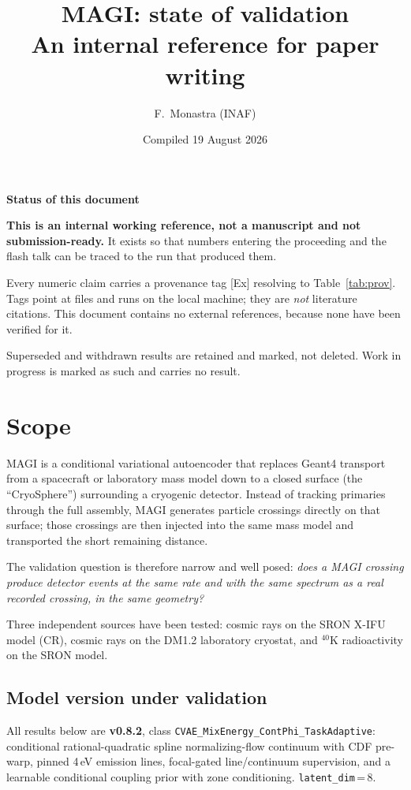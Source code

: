 \documentclass[11pt,a4paper]{article}
\title{\textbf{MAGI: state of validation}\\[2mm]
\large An internal reference for paper writing}
\author{F.\ Monastra (INAF)}
\date{Compiled 19 August 2026}
\newcommand{\ev}[1]{{\footnotesize\textcolor{prov}{[#1]}}}
\newenvironment{callout}[3]%
{\par\medskip\noindent
 \def\calloutframe{#1}\def\calloutback{#2}%
 \setlength{\fboxrule}{0.9pt}\setlength{\fboxsep}{8pt}%
 \begin{lrbox}{\calloutbox}%
 \begin{minipage}{\dimexpr\textwidth-2\fboxsep-2\fboxrule\relax}%
 \setlength{\parskip}{4pt}%
 \textcolor{#1}{\textbf{#3}}\par\nobreak\smallskip}
{\end{minipage}\end{lrbox}%
 \fcolorbox{\calloutframe}{\calloutback}{\usebox{\calloutbox}}%
 \par\medskip}
\begin{document}
\maketitle
\thispagestyle{fancy}

\begin{callout}{warn}{red!4}{Status of this document}
\textbf{This is an internal working reference, not a manuscript and not
submission-ready.} It exists so that numbers entering the proceeding and the
flash talk can be traced to the run that produced them.

Every numeric claim carries a provenance tag \ev{Ex} resolving to
Table~\ref{tab:prov}. Tags point at files and runs on the local machine; they
are \emph{not} literature citations. This document contains no external
references, because none have been verified for it.

Superseded and withdrawn results are retained and marked, not deleted.
Work in progress is marked as such and carries no result.
\end{callout}

\section{Scope}

MAGI is a conditional variational autoencoder that replaces Geant4 transport
from a spacecraft or laboratory mass model down to a closed surface (the
``CryoSphere'') surrounding a cryogenic detector. Instead of tracking primaries
through the full assembly, MAGI generates particle crossings directly on that
surface; those crossings are then injected into the same mass model and
transported the short remaining distance.

The validation question is therefore narrow and well posed: \emph{does a MAGI
crossing produce detector events at the same rate and with the same spectrum as
a real recorded crossing, in the same geometry?}

Three independent sources have been tested: cosmic rays on the SRON X-IFU model
(CR), cosmic rays on the DM1.2 laboratory cryostat, and $^{40}$K
radioactivity on the SRON model.

\subsection{Model version under validation}

All results below are \textbf{v0.8.2}, class
\texttt{CVAE\_MixEnergy\_ContPhi\_TaskAdaptive}: conditional rational-quadratic
spline normalizing-flow continuum with CDF pre-warp, pinned 4\,eV emission
lines, focal-gated line/continuum supervision, and a learnable conditional
coupling prior with zone conditioning. \texttt{latent\_dim}\,=\,8.
\end{document}
